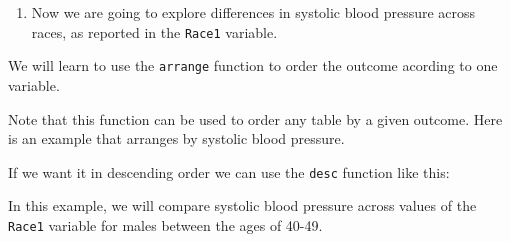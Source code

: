 \documentclass[
]{article}
\newenvironment{Shaded}{\begin{snugshade}}{\end{snugshade}}
\newcommand{\DataTypeTok}[1]{\textcolor[rgb]{0.13,0.29,0.53}{#1}}
\newcommand{\KeywordTok}[1]{\textcolor[rgb]{0.13,0.29,0.53}{\textbf{#1}}}
\newcommand{\NormalTok}[1]{#1}
\newcommand{\OperatorTok}[1]{\textcolor[rgb]{0.81,0.36,0.00}{\textbf{#1}}}
\newcommand{\OtherTok}[1]{\textcolor[rgb]{0.56,0.35,0.01}{#1}}
\newcommand{\StringTok}[1]{\textcolor[rgb]{0.31,0.60,0.02}{#1}}
\providecommand{\tightlist}{%
  \setlength{\itemsep}{0pt}\setlength{\parskip}{0pt}}
\begin{document}
\begin{enumerate}
\def\labelenumi{\arabic{enumi}.}
\setcounter{enumi}{7}
\tightlist
\item
  Now we are going to explore differences in systolic blood pressure
  across races, as reported in the \texttt{Race1} variable.
\end{enumerate}

We will learn to use the \texttt{arrange} function to order the outcome
acording to one variable.

Note that this function can be used to order any table by a given
outcome. Here is an example that arranges by systolic blood pressure.

\begin{Shaded}
\end{Shaded}

If we want it in descending order we can use the \texttt{desc} function
like this:

\begin{Shaded}
\end{Shaded}

In this example, we will compare systolic blood pressure across values
of the \texttt{Race1} variable for males between the ages of 40-49.

\begin{Shaded}
\end{Shaded}
\end{document}

